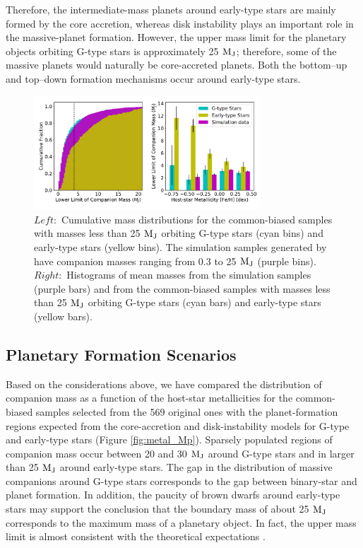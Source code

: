 \documentclass[twocolumn]{aastex62}
\begin{document}
\begin{CJK*}{UTF8}{min}
Therefore, the intermediate-mass planets around early-type stars are mainly formed by the core accretion, whereas disk instability plays an important role in the massive-planet formation. However, the upper mass limit for the planetary objects orbiting G-type stars is approximately 25 $\rm M_J$; therefore, some of the massive planets would naturally be core-accreted planets. Both the bottom--up and top--down formation mechanisms occur around early-type stars.

\begin{figure}[t]
\begin{center}
\includegraphics[width=8.5cm]{simulation.pdf}
\caption{$Left:$ Cumulative mass distributions for the common-biased samples with masses less than 25 $\rm M_J$ orbiting G-type stars (cyan bins) and early-type stars (yellow bins). The simulation samples generated by \cite{2012A&A...541A..97M} have companion masses ranging from 0.3 to 25 $\rm M_J$ (purple bins). $Right:$ Histograms of mean masses from the simulation samples (purple bars) and from the common-biased samples with masses less than 25 $\rm M_J$ orbiting G-type stars (cyan bars) and early-type stars (yellow bars).}
\label{fig:simulation}
\end{center}
\end{figure}


\subsection{Planetary Formation Scenarios} \label{subsec:scenarios}

Based on the considerations above, we have compared the distribution of companion mass as a function of the host-star metallicities for the common-biased samples selected from the 569 original ones with the planet-formation regions expected from the core-accretion and disk-instability models for G-type and early-type stars (Figure \ref{fig:metal_Mp}). Sparsely populated regions of companion mass occur between 20 and 30 $\rm M_J$ around G-type stars and in larger than 25 $\rm M_J$ around early-type stars. The gap in the distribution of massive companions around G-type stars corresponds to the gap between binary-star and planet formation. In addition, the paucity of brown dwarfs around early-type stars may support the conclusion that the boundary mass of about 25 $\rm M_J$ corresponds to the maximum mass of a planetary object. In fact, the upper mass limit is almost consistent with the theoretical expectations \citep{2007ApJ...667..557T, 2009A&A...501.1161M, 2016ApJ...823...48T}. 


\end{CJK*}
\end{document}
